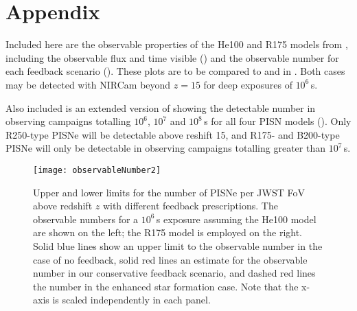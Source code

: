 \documentclass[../thesis.tex]{subfiles}
\begin{document}
\chapter{Appendix}
\label{appendix}
Included here are the observable properties of the He100 and R175 models from
\citet{KasenWoosleyHeger2011}, including the observable flux and time visible 
() and the observable number for each feedback scenario 
().  These plots are to be compared to
 and  in .  Both
cases may be detected with NIRCam beyond $z=15$ for deep exposures of
$10^6\,$s.

Also included is an extended version of  showing
the detectable number in observing campaigns totalling $10^6$, $10^7$
and $10^8\,$s for all four PISN models (). Only
R250-type PISNe will be detectable above reshift 15, and R175- and
B200-type PISNe will only be detectable in observing campaigns
totalling greater than $10^7\,$s.

\begin{figure}
 \begin{center}
   \texttt{[image: observableNumber2]}
   \caption{Upper and lower limits for the number of
     PISNe per JWST FoV above redshift $z$ with different feedback
     prescriptions. The observable numbers for a $10^6\,$s exposure
     assuming the He100 model are shown on the left; the R175 model is
     employed on the right. Solid blue lines show an upper limit
     to the observable number in the case of no feedback, solid red
     lines an estimate for the observable number in our conservative
     feedback scenario, and dashed red lines the number in the
     enhanced star formation case. Note that the x-axis is scaled
     independently in each panel.  }
   \label{obsnumber2}
 \end{center}
\end{figure} 
\end{document}
